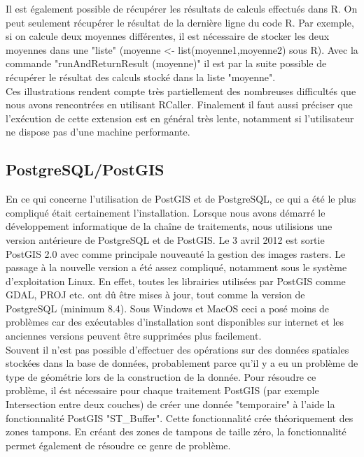 Il est également possible de récupérer les résultats de calculs effectués dans R. On peut seulement récupérer le résultat de la dernière ligne du code R. Par exemple, si on calcule deux moyennes différentes, il est nécessaire de stocker les deux moyennes dans une "liste" (moyenne <- list(moyenne1,moyenne2) sous R). Avec la commande "runAndReturnResult (moyenne)" il est par la suite possible de récupérer le résultat des calculs stocké dans la liste "moyenne".\\

Ces illustrations rendent compte très partiellement des nombreuses difficultés que nous avons rencontrées en utilisant RCaller. Finalement il faut aussi préciser que l'exécution de cette extension est en général très lente, notamment si l'utilisateur ne dispose pas d'une machine performante.

\subsection{PostgreSQL/PostGIS}

En ce qui concerne l'utilisation de PostGIS et de PostgreSQL, ce qui a été le plus compliqué était certainement l'installation. Lorsque nous avons démarré le développement informatique de la chaîne de traitements, nous utilisions une version antérieure de PostgreSQL et de PostGIS. Le 3 avril 2012 est sortie PostGIS 2.0 avec comme principale nouveauté la gestion des images rasters. Le passage à la nouvelle version a été assez compliqué, notamment sous le système d'exploitation Linux. En effet, toutes les librairies utilisées par PostGIS comme GDAL, PROJ etc. ont dû être mises à jour, tout comme la version de PostgreSQL (minimum 8.4). Sous Windows et MacOS ceci a posé moins de problèmes car des exécutables d'installation sont disponibles sur internet et les anciennes versions peuvent être supprimées plus facilement.\\

Souvent il n'est pas possible d'effectuer des opérations sur des données spatiales stockées dans la base de données, probablement parce qu'il y a eu un problème de type de géométrie lors de la construction de la donnée. Pour résoudre ce problème, il ést nécessaire pour chaque traitement PostGIS (par exemple Intersection entre deux couches) de créer une donnée "temporaire" à l'aide la fonctionnalité PostGIS "ST\_Buffer". Cette fonctionnalité crée théoriquement des zones tampons. En créant des zones de tampons de taille zéro, la fonctionnalité permet également de résoudre ce genre de problème.\\


